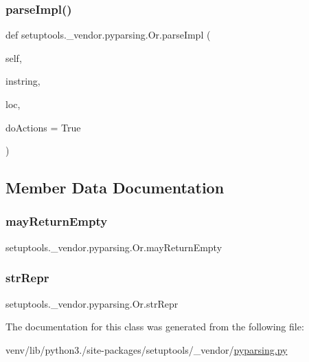 \subsubsection{\texorpdfstring{parse\+Impl()}{parseImpl()}}
{\footnotesize\ttfamily def setuptools.\+\_\+vendor.\+pyparsing.\+Or.\+parse\+Impl (\begin{DoxyParamCaption}\item[{}]{self,  }\item[{}]{instring,  }\item[{}]{loc,  }\item[{}]{do\+Actions = {\ttfamily True} }\end{DoxyParamCaption})}



\subsection{Member Data Documentation}
\mbox{\label{classsetuptools_1_1__vendor_1_1pyparsing_1_1Or_a9fdd01868295eb0d39b27fa15bbabd14}} 
\subsubsection{\texorpdfstring{may\+Return\+Empty}{mayReturnEmpty}}
{\footnotesize\ttfamily setuptools.\+\_\+vendor.\+pyparsing.\+Or.\+may\+Return\+Empty}

\mbox{\label{classsetuptools_1_1__vendor_1_1pyparsing_1_1Or_aad2de411355fe47546488fded5f3b696}} 
\subsubsection{\texorpdfstring{str\+Repr}{strRepr}}
{\footnotesize\ttfamily setuptools.\+\_\+vendor.\+pyparsing.\+Or.\+str\+Repr}



The documentation for this class was generated from the following file\+:\begin{DoxyCompactItemize}
\item 
venv/lib/python3./site-\/packages/setuptools/\+\_\+vendor/\hyperlink{setuptools_2__vendor_2pyparsing_8py}{pyparsing.\+py}\end{DoxyCompactItemize}
